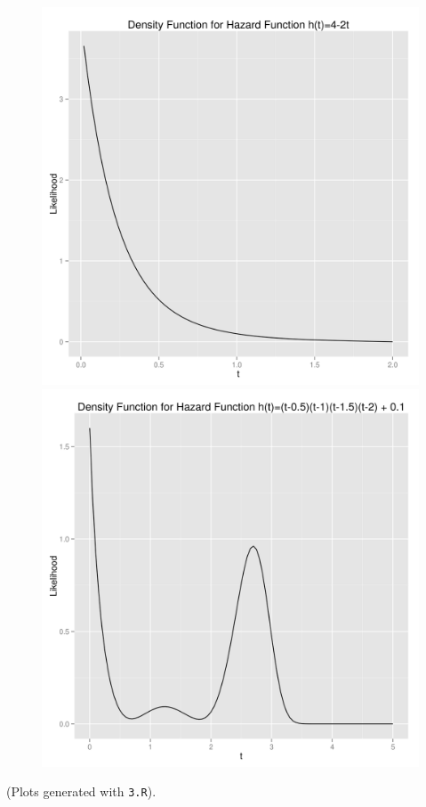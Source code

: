 \documentclass[letter]{article}
\begin{document}
\begin{figure}[H]
\centering
\includegraphics[scale=.33]{figures/3_decreasing.png}
\includegraphics[scale=.33]{figures/3_wshape.png}
\end{figure}
(Plots generated with \texttt{3.R}). 
\end{document}
